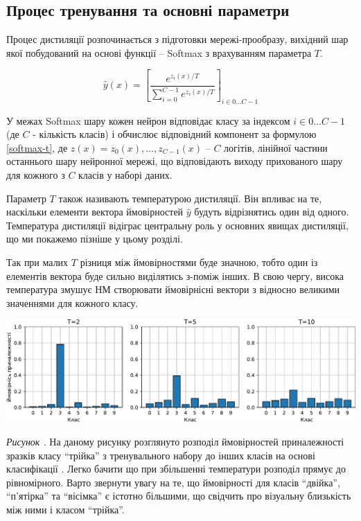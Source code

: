 \documentclass[14pt,a4paper]{extarticle}
\newcounter{e}
\newcounter{pic}
\newcommand{\pic}[1]{\refstepcounter{pic} \vspace{-0.3cm}\textit{Рисунок \arabic{pic}\label{#1}.}}
\numberwithin{equation}{section}
\numberwithin{figure}{section}
\begin{document}
 
 \subsection{Процес тренування та основні параметри}  
 Процес дистиляції розпочинається з підготовки мережі-прообразу, вихідний шар якої побудований на основі функції -- Softmax з врахуванням параметра $T$.
 
 \begin{equation}
 \label{softmax-t}
 \hat{y}(x)=\left[\frac{e^{z_{i}(x) / T}}{\sum\limits_{i=0}^{C-1} e^{z_{i}(x) / T}}\right]_{i \in 0 \dots C-1}
 \end{equation}

 У межах Softmax шару кожен нейрон відповідає класу за індексом $i \in 0 \dots C-1$ (де $C$ - кількість класів) і обчислює відповідний компонент за формулою \ref{softmax-t}, де $z(x) = z_0(x), \dots , z_{C-1}(x)$ -- $C$ логітів, лінійної частини останнього шару нейронної мережі, що відповідають виходу прихованого шару для кожного з $C$ класів у наборі даних.
 
 Параметр $T$ також називають температурою дистиляції. Він впливає на те, наскільки елементи вектора ймовірностей $\hat{y}$ будуть відрізнятись один від одного. Температура дистиляції відіграє центральну роль у основних явищах дистиляції, що ми покажемо пізніше у цьому розділі.

 Так при малих $T$ різниця між ймовірностями буде значною, тобто один із елементів вектора буде сильно виділятись з-поміж інших. В свою чергу, висока температура змушує НМ створювати ймовірнісні вектори з відносно великими значеннями для кожного класу.
 
 \begin{center}
 	\includegraphics[width=17cm]{../images/TvsP.pdf}
 \end{center}
 \begin{center}
 	\pic{distilation} На даному рисунку розглянуто розподіл ймовірностей приналежності зразків класу ``трійка'' з тренувального набору до інших класів на основі класифікації . Легко бачити що при збільшенні температури розподіл прямує до рівномірного. Варто звернути увагу на те, що ймовірності для класів ``двійка'', ``п'ятірка'' та ``вісімка'' є істотно більшими, що свідчить про візуальну близькість між ними і класом ``трійка''.
 \end{center}
 
\end{document}
